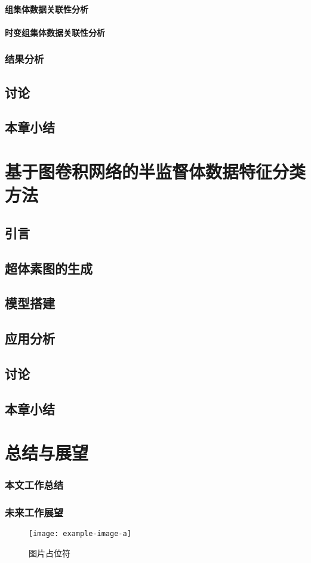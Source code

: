 \subsubsection{组集体数据关联性分析}
\subsubsection{时变组集体数据关联性分析}
\subsection{结果分析}
\section{讨论}
\section{本章小结}

\chapter{基于图卷积网络的半监督体数据特征分类方法}
\section{引言}
\section{超体素图的生成}
\section{模型搭建}
\section{应用分析}
\section{讨论}
\section{本章小结}


\chapter{总结与展望}
\subsection{本文工作总结}
\subsection{未来工作展望}

\begin{figure}[htbp]
    \centering
    \texttt{[image: example-image-a]}
    \caption{\label{fig:fig-placeholder}图片占位符}
\end{figure}
